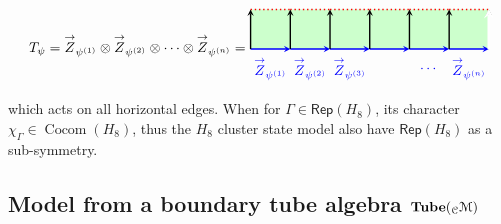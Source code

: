 \documentclass[a4paper,11pt]{article}
\theoremstyle{theorem}
\theoremstyle{remark}
\newcommand\eC           {\EuScript{C}}
\newcommand\eM          {\EuScript{M}}
\newcommand{\Rep}{\mathsf{Rep}}
\newcommand{\ZR}{\overset{\rightarrow}{Z}}
\newcommand{\cone}{(1)}
\newcommand{\ctwo}{(2)}
\newcommand{\cthree}{(3)}
\newcommand{\Cocom}{\operatorname{Cocom}}
\begin{document}
\begin{equation}
    T_{\psi}= \ZR_{\psi^{\cone}} \otimes \ZR_{\psi^{\ctwo}} \otimes \cdots \otimes \ZR_{\psi^{(n)}}= 
    \begin{aligned}
\begin{tikzpicture}
    \def\n{5}
    \def\s{1}
    \fill[green!20] (0, 0) rectangle (\n*\s+\s, \s); %
    \foreach \i in {0,...,\n} {
        \draw[-stealth, line width=1.0pt,blue, midway] (\i*\s, 0) -- (\i*\s+\s, 0);
        \draw[dotted, line width=1.0pt,red, midway] (\i*\s, \s) -- (\i*\s+\s, \s);
        \draw[-stealth,line width=1.0pt, midway] (\i*\s, 0) -- (\i*\s, \s);
    }
    \draw[-stealth, midway,line width=1.0pt] (\n*\s+\s, 0) -- (\n*\s+\s, \s);
    \node[ line width=0.2pt, dashed, draw opacity=0.5] (a) at (.5,-0.5){\color{blue}$\ZR_{\psi^{\cone}}$};
    \node[ line width=0.2pt, dashed, draw opacity=0.5] (a) at (1.5,-0.5){\color{blue}$\ZR_{\psi^{\ctwo}}$};
    \node[ line width=0.2pt, dashed, draw opacity=0.5] (a) at (2.5,-0.5){\color{blue}$\ZR_{\psi^{\cthree}}$};
    \node[ line width=0.2pt, dashed, draw opacity=0.5] (a) at (4.5,-0.5){\color{blue}$\cdots$};
     \node[ line width=0.2pt, dashed, draw opacity=0.5] (a) at (5.5,-0.5){\color{blue}$\ZR_{\psi^{(n)}}$};
      \draw[-stealth, white, line width=2pt, midway] (6, 0) -- (6, 1.02);
\end{tikzpicture}
\end{aligned}
\end{equation}
which acts on all horizontal edges.
When for $\Gamma\in \Rep(H_8)$, its character $\chi_{\Gamma} \in \Cocom(H_8)$, thus the $H_8$ cluster state model also have $\Rep(H_8)$ as a sub-symmetry.



\subsection{Model from a boundary tube algebra $\mathbf{Tube}({_{\eC}}\eM)$}
\end{document}
